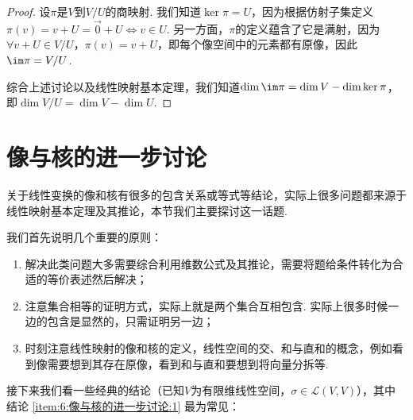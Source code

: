 \begin{proof}
    设$\pi$是$V$到$V/U$的商映射. 我们知道$\ker\pi=U$，因为根据仿射子集定义$\pi(v)=v+U=\vec{0}+U\iff v\in U$. 另一方面，$\pi$的定义蕴含了它是满射，因为$\forall v+U\in V/U$，$\pi(v)=v+U$，即每个像空间中的元素都有原像，因此$\im\pi=V/U$.

    综合上述讨论以及线性映射基本定理，我们知道$\dim\im\pi=\dim V-\dim\ker\pi$，即$\dim V/U=\dim V-\dim U$.
\end{proof}

\section{像与核的进一步讨论}

关于线性变换的像和核有很多的包含关系或等式等结论，实际上很多问题都来源于线性映射基本定理及其推论，本节我们主要探讨这一话题.

我们首先说明几个重要的原则：
\begin{enumerate}
    \item 解决此类问题大多需要综合利用维数公式及其推论，需要将题给条件转化为合适的等价表述然后解决；

    \item 注意集合相等的证明方式，实际上就是两个集合互相包含. 实际上很多时候一边的包含是显然的，只需证明另一边；

    \item 时刻注意线性映射的像和核的定义，线性空间的交、和与直和的概念，例如看到像需要想到其存在原像，看到和与直和要想到将向量分拆等.
\end{enumerate}

接下来我们看一些经典的结论（已知$V$为有限维线性空间，$\sigma\in \mathcal{L}(V,V)$），其中结论 \ref*{item:6:像与核的进一步讨论:1} 最为常见：

